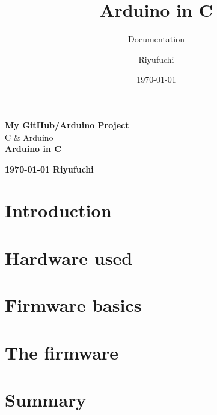 \documentclass[12pt,a4paper,titlepage]{scrreprt}
\title{\vspace{6cm}Arduino in C}
\subtitle{Documentation}
\author{Riyufuchi}
\date{\today}
\begin{document}
	
	
	\begin{titlepage}
		\begin{center}
			{\Large \textbf{My GitHub/Arduino Project}} \\
			{\Large C \& Arduino} \\
			\vfill
			{\Huge \textbf{Arduino in C}}
			\vfill
		\end{center}
		{\large\textbf{ \today}} \hfill {\large \textbf{Riyufuchi}}
	\end{titlepage}
	
	\tableofcontents
	\newpage
	
	\clearpage
	\printglossary[type=main, title=Glossary]
	
	\clearpage
	\printglossary[type=\acronymtype, style=mystyle]
	
	\chapter{Introduction}
	
	
	\chapter{Hardware used}
	
	
	\chapter{Firmware basics}
	
	
	\chapter{The firmware}
	
	
	\chapter*{Summary}
	
	\lstlistoflistings
\end{document}
